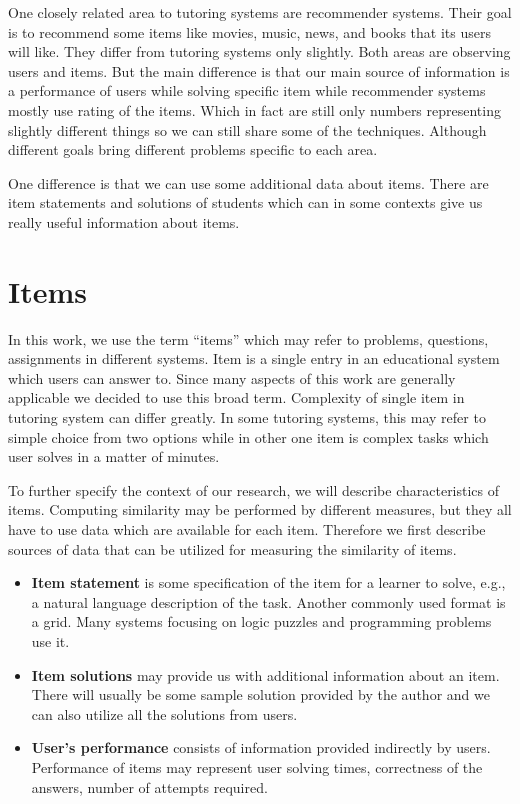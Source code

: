 \documentclass[
  digital, %
  table,   %
  nolof,     %
  nolot,     %
  nocover,
  color,
  final, %
]{fithesis3}
\begin{document}
One closely related area to tutoring systems are recommender systems. Their goal is to recommend some items like movies, music, news, and books that its users will like. They differ from tutoring systems only slightly. Both areas are observing users and items. But the main difference is that our main source of information is a performance of users while solving specific item while recommender systems mostly use rating of the items. Which in fact are still only numbers representing slightly different things so we can still share some of the techniques. Although different goals bring different problems specific to each area.


One difference is that we can use some additional data about items. There are item statements and solutions of students which can in some contexts give us really useful information about items.


\section{Items}\label{items}


In this work, we use the term ``items'' which may refer to problems, questions, assignments in different systems. Item is a single entry in an educational system which users can answer to. Since many aspects of this work are generally applicable we decided to use this broad term. Complexity of single item in tutoring system can differ greatly. In some tutoring systems, this may refer to simple choice from two options while in other one item is complex tasks which user solves in a matter of minutes.


To further specify the context of our research, we will describe characteristics of items. Computing similarity may be performed by different measures, but they all have to use data which are available for each item. Therefore we first describe sources of data that can be utilized for measuring the similarity of items.

\begin{itemize}
\item
  \textbf{Item statement} is some specification of the item for a learner to solve, e.g., a natural language description of the task. Another commonly used format is a grid. Many systems focusing on logic puzzles and programming problems use it.
\item
  \textbf{Item solutions} may provide us with additional information about an item. There will usually be some sample solution provided by the author and we can also utilize all the solutions from users.
\item
  \textbf{User's performance} consists of information provided indirectly by users. Performance of items may represent user solving times, correctness of the answers, number of attempts required.
\end{itemize}
\end{document}
